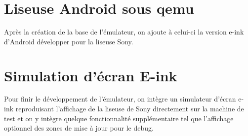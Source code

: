 \section{Liseuse Android sous qemu}

Après la création de la base de l'émulateur, on ajoute à celui-ci la version e-ink d'Android développer pour la liseuse Sony. 

\section{Simulation d'écran E-ink}

Pour finir le développement de l'émulateur, on intègre un simulateur d'écran e-ink reproduisant l'affichage de la liseuse de Sony directement sur la machine de test et on y intègre quelque fonctionnalité supplémentaire tel que l'affichage optionnel des zones de mise à jour pour le debug.